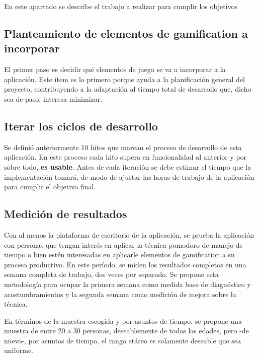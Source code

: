 \documentclass[12pt,letterpaper]{report}
\begin{document}
En este apartado se describe el trabajo a realizar para cumplir los
objetivos

\hypertarget{planteamiento-de-elementos-de-gamification-a-incorporar}{%
\subsection{Planteamiento de elementos de gamification a
incorporar}\label{planteamiento-de-elementos-de-gamification-a-incorporar}}

El primer paso es decidir qué elementos de juego se va a incorporar a la
aplicación. Este ítem es lo primero porque ayuda a la planificación
general del proyecto, contribuyendo a la adaptación al tiempo total de
desarrollo que, dicho sea de paso, interesa minimizar.

\hypertarget{iterar-los-ciclos-de-desarrollo}{%
\subsection{Iterar los ciclos de
desarrollo}\label{iterar-los-ciclos-de-desarrollo}}

Se definió anteriormente 10 hitos que marcan el proceso de desarrollo de
esta aplicación. En este proceso cada hito supera en funcionalidad al
anterior y por sobre todo, \textbf{es usable}. Antes de cada iteración
se debe estimar el tiempo que la implementación tomará, de modo de
ajustar las horas de trabajo de la aplicación para cumplir el objetivo
final.

\hypertarget{mediciuxf3n-de-resultados-1}{%
\subsection{Medición de resultados}\label{mediciuxf3n-de-resultados-1}}

Con al menos la plataforma de escritorio de la aplicación, se prueba la
aplicación con personas que tengan interés en aplicar la técnica
pomodoro de manejo de tiempo o bien estén interesadas en aplicarle
elementos de gamification a su proceso productivo. En este período, se
miden los resultados completos en una semana completa de trabajo, dos
veces por separado. Se propone esta metodología para ocupar la primera
semana como medida base de diagnóstico y acostumbramientos y la segunda
semana como medición de mejora sobre la técnica.

En términos de la muestra escogida y por asuntos de tiempo, se propone
una muestra de entre 20 a 30 personas, deseablemente de todas las
edades, pero -de nuevo-, por asuntos de tiempo, el rango etáreo es
solamente deseable que sea uniforme.
\end{document}
